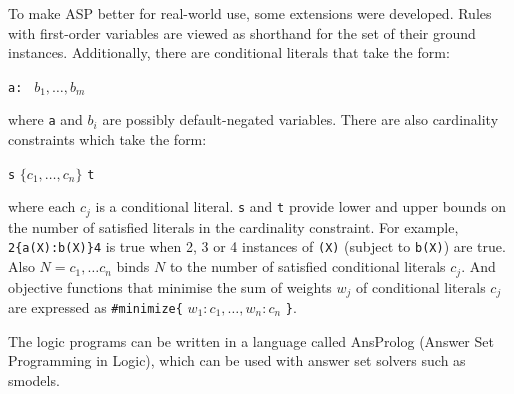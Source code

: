 \documentclass[a4paper, 12pt]{report}
\begin{document}
To make ASP better for real-world use, some extensions were developed.
Rules with first-order variables are viewed as shorthand for the set of their
ground instances.
Additionally, there are conditional literals that take the form:
\begin{center}
	\verb|a: | \( b_1, \ldots, b_m \)
\end{center}
where \verb|a| and \( b_i \) are possibly default-negated variables.
There are also cardinality constraints which take the form:
\begin{center}
	\verb|s| \( \{c_1, \ldots, c_n\} \) \verb|t|
\end{center}
where each \( c_j \) is a conditional literal.
\verb|s| and \verb|t| provide lower and upper bounds on the number of satisfied
literals in the cardinality constraint.
For example, \verb|2{a(X):b(X)}4| is true when 2, 3 or 4 instances of \verb|(X)|
(subject to \verb|b(X)|) are true. 
Also \( N=c_1,\ldots c_n \) binds \( N \) to the number of satisfied conditional
literals \( c_j \).
And objective functions that minimise the sum of weights \( w_j \) of
conditional literals \( c_j \) are expressed as \verb|#minimize{| \( w_1:c_1,
\ldots, w_n:c_n \) \verb|}|.

The logic programs can be written in a language called AnsProlog (Answer Set
Programming in Logic), which can be used with answer set solvers such as
smodels.
\end{document}
